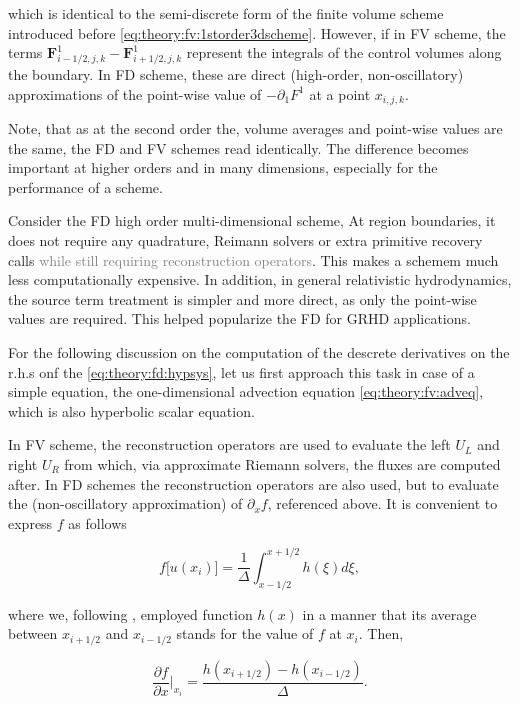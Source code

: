 which is identical to the semi-discrete form of the finite volume scheme introduced before \ref{eq:theory:fv:1storder3dscheme}. 
However, if in FV scheme, the terms $\boldsymbol{F}^{1}_{i-1/2,j,k} - \boldsymbol{F}^{1}_{i+1/2,j,k}$ represent the integrals of the control volumes along the boundary. 
In FD scheme, these are direct (high-order, non-oscillatory) approximations of the point-wise value of $-\partial_1 F^1$ at a point $x_{i,j,k}$. 

Note, that as at the second order the, volume averages and point-wise values are the same, the FD and FV schemes read identically. The difference becomes important at higher orders and in many dimensions, especially for the performance of a scheme. 

Consider the FD high order multi-dimensional scheme, At region boundaries, it does not require any quadrature, Reimann solvers or extra primitive recovery calls \textcolor{gray}{while still requiring reconstruction operators}. This makes a schemem much less computationally expensive. In addition, in general relativistic hydrodynamics, the source term treatment is simpler and more direct, as only the point-wise values are required. 
This helped popularize the FD for GRHD applications. 

For the following discussion on the computation of the descrete derivatives on the r.h.s onf the \ref{eq:theory:fd:hypsys}, let us first approach this task in case of a simple equation, the one-dimensional advection equation \ref{eq:theory:fv:adveq}, which is also hyperbolic scalar equation. 

In FV scheme, the reconstruction operators are used to evaluate the left $U_L$ and right $U_R$ from which, via approximate Riemann solvers, the fluxes are computed after. 
In FD schemes the reconstruction operators are also used, but to evaluate the (non-oscillatory approximation) of $\partial_x f$, referenced above. It is convenient to express $f$ as follows

\begin{equation}
f\big[u(x_i)\big] = \frac{1}{\Delta}\int_{x-1/2}^{x+1/2}h(\xi)d\xi,
\label{eq:theory:fd:introd_h}
\end{equation}

where we, following \cite{Shu:1988}, employed function $h(x)$ in a manner that its average between $x_{i+1/2}$ and $x_{i-1/2}$ stands for the value of $f$ at $x_i$. Then, 

\begin{equation}
\frac{\partial f}{\partial x}\Big|_{x_i} = \frac{h(x_{i+1/2}) - h(x_{i-1/2})}{\Delta}.
\label{eq:theory:fd:diff_via_h}
\end{equation}

